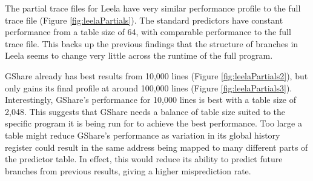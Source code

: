 \clearpage
The partial trace files for Leela have very similar performance profile to the full trace file (Figure \ref{fig:leelaPartials}). The standard predictors have constant performance from a table size of 64, with comparable performance to the full trace file. This backs up the previous findings that the structure of branches in Leela seems to change very little across the runtime of the full program.

GShare already has best results from 10,000 lines (Figure \ref{fig:leelaPartials2}), but only gains its final profile at around 100,000 lines (Figure \ref{fig:leelaPartials3}). Interestingly, GShare's performance for 10,000 lines is best with a table size of 2,048. This suggests that GShare needs a balance of table size suited to the specific program it is being run for to achieve the best performance. Too large a table might reduce GShare's performance as variation in its global history register could result in the same address being mapped to many different parts of the predictor table. In effect, this would reduce its ability to predict future branches from previous results, giving a higher misprediction rate.

